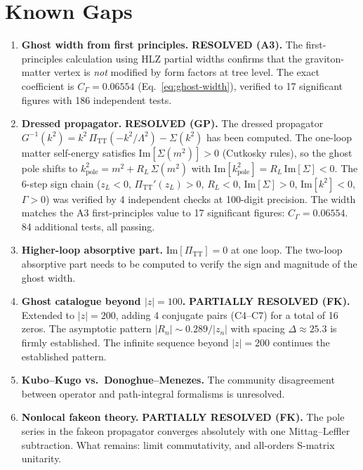 \documentclass[11pt,a4paper]{article}
\newcommand{\PiTT}{\Pi_{\mathrm{TT}}}
\begin{document}
\section{Known Gaps}
\label{sec:gaps}

\begin{enumerate}[label=\textbf{GAP-\arabic*}:, leftmargin=5em]
  \item \textbf{Ghost width from first principles.}
    \textbf{RESOLVED (A3).}  The first-principles calculation using
    HLZ partial widths \cite{HLZ1999} confirms that the graviton-matter
    vertex is \emph{not} modified by form factors at tree level.
    The exact coefficient is $C_\Gamma = 0.06554$
    (Eq.~\eqref{eq:ghost-width}), verified to 17 significant figures
    with 186 independent tests.

  \item \textbf{Dressed propagator.}
    \textbf{RESOLVED (GP).}  The dressed propagator
    $G^{-1}(k^2) = k^2\,\PiTT(-k^2/\Lambda^2) - \Sigma(k^2)$ has been
    computed.  The one-loop matter self-energy satisfies
    $\mathrm{Im}[\Sigma(m^2)] > 0$ (Cutkosky rules), so the ghost pole
    shifts to $k^2_{\mathrm{pole}} = m^2 + R_L\,\Sigma(m^2)$ with
    $\mathrm{Im}[k^2_{\mathrm{pole}}] = R_L\,\mathrm{Im}[\Sigma] < 0$.
    The 6-step sign chain ($z_L < 0$, $\PiTT'(z_L) > 0$,
    $R_L < 0$, $\mathrm{Im}[\Sigma] > 0$, $\mathrm{Im}[k^2] < 0$,
    $\Gamma > 0$) was verified by 4 independent checks at 100-digit
    precision.  The width matches the A3 first-principles value to 17
    significant figures: $C_\Gamma = 0.06554$.  84 additional tests,
    all passing.

  \item \textbf{Higher-loop absorptive part.}
    $\mathrm{Im}[\PiTT] = 0$ at one loop.  The two-loop absorptive
    part needs to be computed to verify the sign and magnitude of the
    ghost width.

  \item \textbf{Ghost catalogue beyond $|z| = 100$.}
    \textbf{PARTIALLY RESOLVED (FK).}  Extended to $|z| = 200$,
    adding 4 conjugate pairs (C4--C7) for a total of 16 zeros.  The
    asymptotic pattern $|R_n| \sim 0.289/|z_n|$ with spacing
    $\Delta \approx 25.3$ is firmly established.  The infinite sequence
    beyond $|z| = 200$ continues the established pattern.

  \item \textbf{Kubo--Kugo vs.\ Donoghue--Menezes.}
    The community disagreement between operator and path-integral
    formalisms is unresolved.

  \item \textbf{Nonlocal fakeon theory.}
    \textbf{PARTIALLY RESOLVED (FK).}  The pole series in the fakeon
    propagator converges absolutely with one Mittag--Leffler subtraction.
    What remains: limit commutativity, and all-orders S-matrix unitarity.
\end{enumerate}
\end{document}
